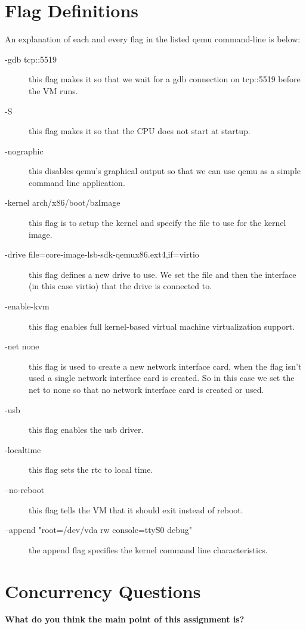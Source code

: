 \documentclass[10pt,letterpaper,draftclsnofoot,onecolumn]{IEEEtran}
\begin{document}
\section{Flag Definitions}
\noindent An explanation of each and every flag in the listed qemu command-line is below:
\begin{description}
\item [-gdb tcp::5519] this flag makes it so that we wait for a gdb connection on tcp::5519 before the VM runs.
\item [-S] this flag makes it so that the CPU does not start at startup.
\item [-nographic] this disables qemu's graphical output so that we can use qemu as a simple command line application.
\item [-kernel arch/x86/boot/bzImage] this flag is to setup the kernel and specify the file to use for the kernel image.
\item [-drive file=core-image-lsb-sdk-qemux86.ext4,if=virtio] this flag defines a new drive to use. We set the file and then the interface (in this case virtio) that the drive is connected to.
\item [-enable-kvm] this flag enables full kernel-based virtual machine virtualization support.
\item [-net none] this flag is used to create a new network interface card, when the flag isn’t used a single network interface card is created. So in this case we set the net to none so that no network interface card is created or used.
\item [-usb] this flag enables the usb driver.
\item [-localtime] this flag sets the rtc to local time.
\item [--no-reboot] this flag tells the VM that it should exit instead of reboot.
\item [--append "root=/dev/vda rw console=ttyS0 debug"] the append flag specifies the kernel command line characteristics.
\end{description}

\section{Concurrency Questions}
\noindent\textbf{What do you think the main point of this assignment is?}

\end{document}
